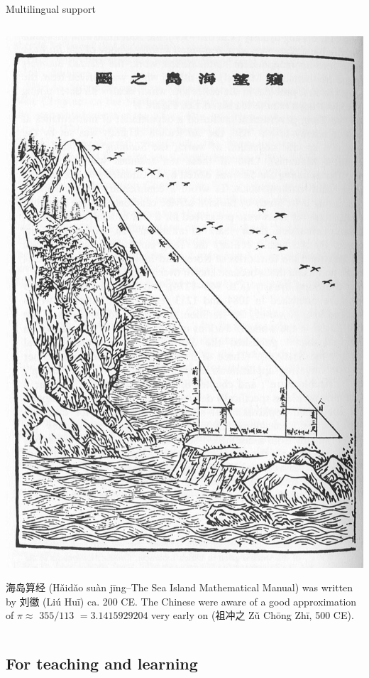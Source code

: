 \documentclass[,aspectratio=43]{beamer}
\begin{document}
\begin{frame}{Multilingual support}
\begin{columns}[T]
\begin{column}{0.48\textwidth}
\justifying

\begin{center}\includegraphics[width=1\linewidth,height=0.45\textheight]{figure/00-haidaosuanjing} \end{center}

海岛算经 (Hǎidǎo suàn jīng--The Sea Island Mathematical Manual) was
written by 刘徽 (Liú Huī) ca. 200 CE. The Chinese were aware of a good
approximation of \(\pi\approx\) \(355/113\) \(= 3.1415929204\) very
early on (祖冲之 Zǔ Chōng Zhī, 500 CE).
\end{column}
\end{columns}
\end{frame}

\hypertarget{for-teaching-and-learning}{%
\subsection{For teaching and learning}\label{for-teaching-and-learning}}
\end{document}
